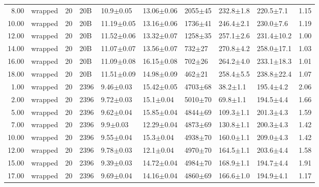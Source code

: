 \begin{tabular}{rlrllllllr}
      8.00 &       wrapped &      20 &     20B &        10.9$\pm$0.05 &   13.06$\pm$0.06 &  2055$\pm$45 &   232.8$\pm$1.8 &   220.5$\pm$7.1 &        1.15 \\
     10.00 &       wrapped &      20 &     20B &       11.19$\pm$0.05 &   13.16$\pm$0.06 &  1736$\pm$41 &   246.4$\pm$2.1 &   230.0$\pm$7.6 &        1.19 \\
     12.00 &       wrapped &      20 &     20B &       11.52$\pm$0.06 &   13.32$\pm$0.07 &  1258$\pm$35 &   257.1$\pm$2.6 &  231.4$\pm$10.2 &        1.00 \\
     14.00 &       wrapped &      20 &     20B &       11.07$\pm$0.07 &   13.56$\pm$0.07 &   732$\pm$27 &   270.8$\pm$4.2 &  258.0$\pm$17.1 &        1.03 \\
     16.00 &       wrapped &      20 &     20B &       11.09$\pm$0.08 &   16.15$\pm$0.08 &   702$\pm$26 &   264.2$\pm$4.0 &  233.1$\pm$18.3 &        1.01 \\
     18.00 &       wrapped &      20 &     20B &       11.51$\pm$0.09 &   14.98$\pm$0.09 &   462$\pm$21 &   258.4$\pm$5.5 &  238.8$\pm$22.4 &        1.07 \\
      1.00 &       wrapped &      20 &    2396 &        9.46$\pm$0.03 &   15.42$\pm$0.05 &  4703$\pm$68 &    38.2$\pm$1.1 &   195.4$\pm$4.2 &        2.06 \\
      2.00 &       wrapped &      20 &    2396 &        9.72$\pm$0.03 &    15.1$\pm$0.04 &  5010$\pm$70 &    69.8$\pm$1.1 &   194.5$\pm$4.4 &        1.66 \\
      5.00 &       wrapped &      20 &    2396 &        9.62$\pm$0.04 &   15.85$\pm$0.04 &  4844$\pm$69 &   109.3$\pm$1.1 &   201.3$\pm$4.3 &        1.59 \\
      7.00 &       wrapped &      20 &    2396 &         9.9$\pm$0.03 &   12.29$\pm$0.04 &  4873$\pm$69 &   130.8$\pm$1.1 &   200.3$\pm$4.3 &        1.42 \\
     10.00 &       wrapped &      20 &    2396 &        9.55$\pm$0.04 &    15.3$\pm$0.04 &  4938$\pm$70 &   160.0$\pm$1.1 &   209.0$\pm$4.3 &        1.42 \\
     12.00 &       wrapped &      20 &    2396 &        9.78$\pm$0.03 &    12.1$\pm$0.04 &  4970$\pm$70 &   164.5$\pm$1.1 &   203.6$\pm$4.4 &        1.58 \\
     15.00 &       wrapped &      20 &    2396 &        9.39$\pm$0.03 &   14.72$\pm$0.04 &  4984$\pm$70 &   168.9$\pm$1.1 &   194.7$\pm$4.4 &        1.91 \\
     17.00 &       wrapped &      20 &    2396 &        9.69$\pm$0.04 &   14.16$\pm$0.04 &  4860$\pm$69 &   166.6$\pm$1.0 &   194.9$\pm$4.1 &        1.17 \\

\end{tabular}
